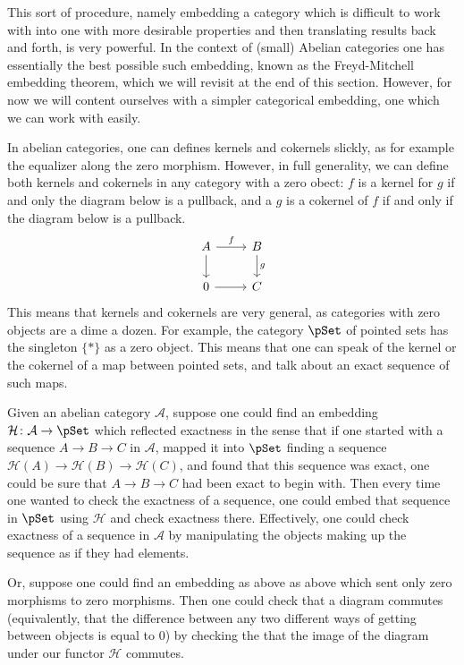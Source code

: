 \documentclass[main.tex]{subfiles}
\begin{document}
This sort of procedure, namely embedding a category which is difficult to work with into one with more desirable properties and then translating results back and forth, is very powerful. In the context of (small) Abelian categories one has essentially the best possible such embedding, known as the Freyd-Mitchell embedding theorem, which we will revisit at the end of this section. However, for now we will content ourselves with a simpler categorical embedding, one which we can work with easily.

In abelian categories, one can defines kernels and cokernels slickly, as for example the equalizer along the zero morphism. However, in full generality, we can define both kernels and cokernels in any category with a zero obect: $f$ is a kernel for $g$ if and only the diagram below is a pullback, and a $g$ is a cokernel of $f$ if and only if the diagram below is a pullback.
\begin{equation*}
  \begin{tikzcd}
    A
    \arrow[r, "f"]
    \arrow[d]
    & B
    \arrow[d, "g"]
    \\
    0
    \arrow[r]
    & C
  \end{tikzcd}
\end{equation*}
This means that kernels and cokernels are very general, as categories with zero objects are a dime a dozen. For example, the category $\pSet$ of pointed sets has the singleton $\{*\}$ as a zero object. This means that one can speak of the kernel or the cokernel of a map between pointed sets, and talk about an exact sequence of such maps.

Given an abelian category $\mathcal{A}$, suppose one could find an embedding $\mathcal{H}\colon \mathcal{A} \to \pSet$ which reflected exactness in the sense that if one started with a sequence $A \to B \to C$ in $\mathcal{A}$, mapped it into $\pSet$ finding a sequence $\mathcal{H}(A) \to \mathcal{H}(B) \to \mathcal{H}(C)$, and found that this sequence was exact, one could be sure that $A \to B \to C$ had been exact to begin with. Then every time one wanted to check the exactness of a sequence, one could embed that sequence in $\pSet$ using $\mathcal{H}$ and check exactness there. Effectively, one could check exactness of a sequence in $\mathcal{A}$ by manipulating the objects making up the sequence as if they had elements.

Or, suppose one could find an embedding as above as above which sent only zero morphisms to zero morphisms. Then one could check that a diagram commutes (equivalently, that the difference between any two different ways of getting between objects is equal to $0$) by checking the that the image of the diagram under our functor $\mathcal{H}$ commutes.
\end{document}
